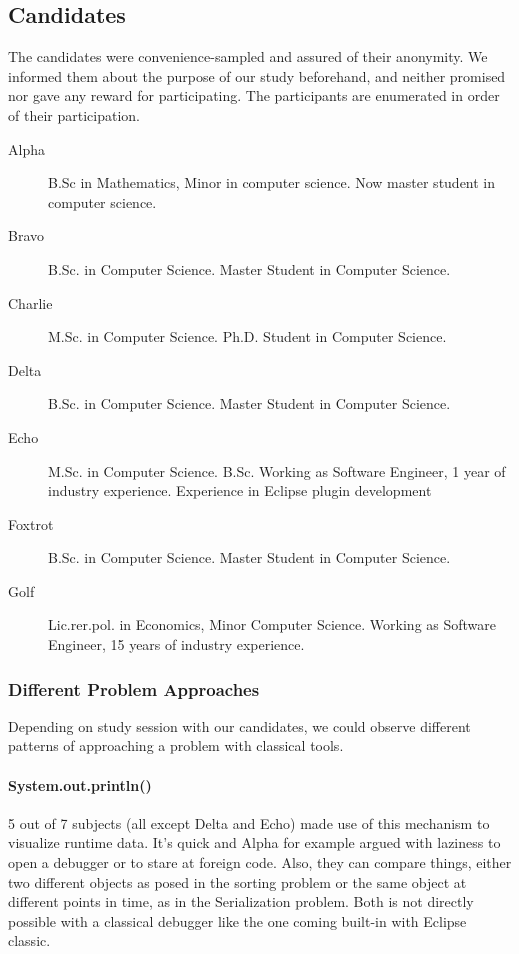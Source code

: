 \documentclass[english]{acm_proc_article-sp}
\newcommand\nes[1]{\nbc{nes}{#1}{blue}}
\begin{document}
\subsection{Candidates}
The candidates were convenience-sampled and assured of their anonymity. We informed them about the purpose of our study beforehand, and neither promised nor gave any reward for participating. The participants are enumerated in order of their participation.

\nes{Todo: reduce white space.}
\begin{description}
\item [{Alpha}] B.Sc in Mathematics, Minor in computer science. Now master student in computer science. %
\item [{Bravo}] B.Sc. in Computer Science. Master Student  in Computer Science.
\item [{Charlie}] M.Sc. in Computer Science. Ph.D. Student in Computer Science.
\item [{Delta}] B.Sc. in Computer Science. Master Student  in Computer Science.
\item [{Echo}] M.Sc. in Computer Science. B.Sc. Working as Software Engineer, 1 year of industry experience. Experience in Eclipse plugin development
\item [{Foxtrot}] B.Sc. in Computer Science. Master Student  in Computer Science.
\item [{Golf}] Lic.rer.pol. in Economics, Minor Computer Science. Working as Software Engineer, 15 years of industry experience. %
\end{description}

\subsubsection{Different Problem Approaches}
Depending on study session with our candidates, we could observe different patterns of approaching a problem with classical tools.
\paragraph{System.out.println()}
5 out of 7 subjects (all except Delta and Echo) made use of this mechanism to visualize runtime data. 
It's quick and Alpha for example argued with laziness to open a debugger or to stare at foreign code. 
Also, they can compare things, either two different objects as posed in the sorting problem or the same object at different points in time, as in the Serialization problem. 
Both is not directly possible with a classical debugger like the one coming built-in with Eclipse classic.
\end{document}
